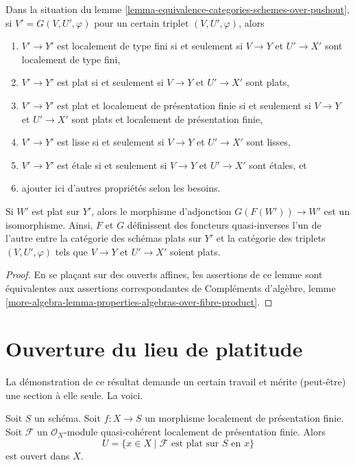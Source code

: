 \begin{lemma}
\label{lemma-equivalence-categories-schemes-over-pushout-flat}
Dans la situation du
lemme \ref{lemma-equivalence-categories-schemes-over-pushout},
si $V' = G(V, U', \varphi)$ pour un certain triplet $(V, U', \varphi)$, alors
\begin{enumerate}
\item $V' \to Y'$ est localement de type fini si et seulement si $V \to Y$ et
$U' \to X'$ sont localement de type fini,
\item $V' \to Y'$ est plat si et seulement si $V \to Y$ et $U' \to X'$ sont plats,
\item $V' \to Y'$ est plat et localement de présentation finie si et seulement si
$V \to Y$ et $U' \to X'$ sont plats et localement de présentation finie,
\item $V' \to Y'$ est lisse si et seulement si $V \to Y$ et $U' \to X'$ sont lisses,
\item $V' \to Y'$ est étale si et seulement si $V \to Y$ et $U' \to X'$
sont étales, et
\item ajouter ici d'autres propriétés selon les besoins.
\end{enumerate}
Si $W'$ est plat sur $Y'$, alors le morphisme d'adjonction
$G(F(W')) \to W'$ est un isomorphisme. Ainsi, $F$ et $G$ définissent des foncteurs
quasi-inverses l'un de l'autre entre la catégorie des schémas plats sur $Y'$
et la catégorie des triplets $(V, U', \varphi)$ tels que $V \to Y$
et $U' \to X'$ soient plats.
\end{lemma}

\begin{proof}
En se plaçant sur des ouverts affines, les assertions de ce lemme
sont équivalentes aux assertions correspondantes de
Compléments d'algèbre, lemme
\ref{more-algebra-lemma-properties-algebras-over-fibre-product}.
\end{proof}


\section{Ouverture du lieu de platitude}
\label{section-open-flat}

\noindent
La démonstration de ce résultat demande un certain travail et mérite
(peut-être) une section à elle seule. La voici.

\begin{theorem}
\label{theorem-openness-flatness}
\begin{reference}
\cite[IV, théorème 11.3.1]{EGA}
\end{reference}
Soit $S$ un schéma.
Soit $f : X \to S$ un morphisme localement de présentation finie.
Soit $\mathcal{F}$ un $\mathcal{O}_X$-module quasi-cohérent
localement de présentation finie. Alors
$$
U = \{x \in X \mid \mathcal{F}\text{ est plat sur }S\text{ en }x\}
$$
est ouvert dans $X$.
\end{theorem}

